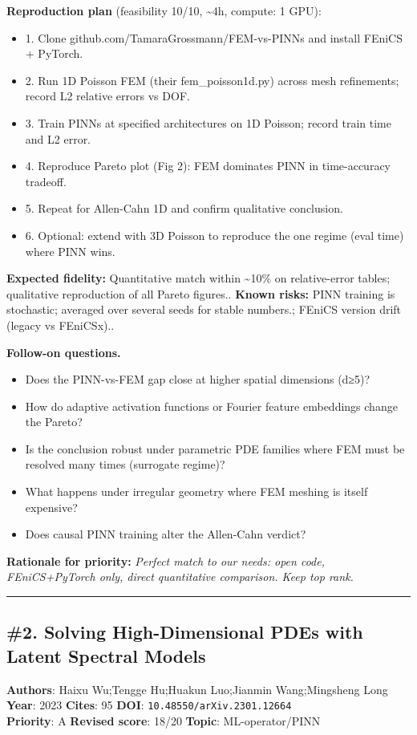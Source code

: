 \documentclass[10pt,letterpaper]{article}
\begin{document}
\textbf{Reproduction plan} (feasibility 10/10, \textasciitilde4h, compute: 1 GPU):
\begin{itemize}
\item 1. Clone github.com/TamaraGrossmann/FEM-vs-PINNs and install FEniCS + PyTorch.
\item 2. Run 1D Poisson FEM (their fem\_poisson1d.py) across mesh refinements; record L2 relative errors vs DOF.
\item 3. Train PINNs at specified architectures on 1D Poisson; record train time and L2 error.
\item 4. Reproduce Pareto plot (Fig 2): FEM dominates PINN in time-accuracy tradeoff.
\item 5. Repeat for Allen-Cahn 1D and confirm qualitative conclusion.
\item 6. Optional: extend with 3D Poisson to reproduce the one regime (eval time) where PINN wins.
\end{itemize}
\textbf{Expected fidelity:} Quantitative match within \~{}10\% on relative-error tables; qualitative reproduction of all Pareto figures.. \textbf{Known risks:} PINN training is stochastic; averaged over several seeds for stable numbers.; FEniCS version drift (legacy vs FEniCSx)..

\textbf{Follow-on questions.}
\begin{itemize}
\item Does the PINN-vs-FEM gap close at higher spatial dimensions (d≥5)?
\item How do adaptive activation functions or Fourier feature embeddings change the Pareto?
\item Is the conclusion robust under parametric PDE families where FEM must be resolved many times (surrogate regime)?
\item What happens under irregular geometry where FEM meshing is itself expensive?
\item Does causal PINN training alter the Allen-Cahn verdict?
\end{itemize}

\textbf{Rationale for priority:} \emph{Perfect match to our needs: open code, FEniCS+PyTorch only, direct quantitative comparison. Keep top rank.}

\medskip\hrule\medskip

\subsection*{\#2. Solving High-Dimensional PDEs with Latent Spectral Models}
\textbf{Authors}: Haixu Wu;Tengge Hu;Huakun Luo;Jianmin Wang;Mingsheng Long \textbullet{} \textbf{Year}: 2023 \textbullet{} \textbf{Cites}: 95 \textbullet{} \textbf{DOI}: \texttt{10.48550/arXiv.2301.12664} \\
\textbf{Priority}: A \textbullet{} \textbf{Revised score}: 18/20 \textbullet{} \textbf{Topic}: ML-operator/PINN
\end{document}

